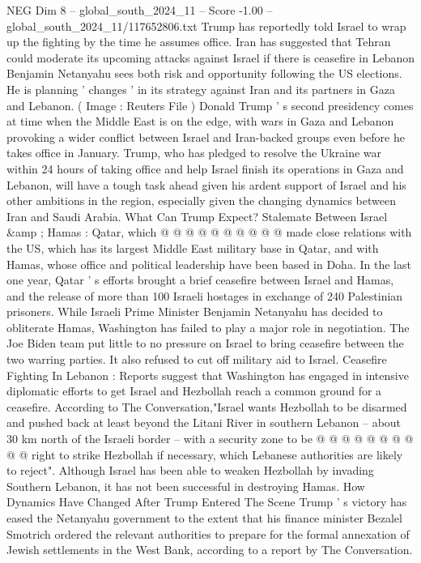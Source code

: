 \begin{textsample}{NEG Dim 8 – global\_south\_2024\_11 – Score -1.00 – global\_south\_2024\_11/117652806.txt}  \label{ex:f8_neg_288}
Trump has reportedly told Israel to wrap up the fighting by the time he assumes office.
Iran has suggested that Tehran could moderate its upcoming attacks against Israel if there is ceasefire in Lebanon Benjamin Netanyahu sees both risk and opportunity following the US elections.
He is planning ' changes ' in its strategy against Iran and its partners in Gaza and Lebanon. ( Image : Reuters File ) Donald Trump ' s second presidency comes at time when the Middle East is on the edge, with wars in Gaza and Lebanon provoking a wider conflict between Israel and Iran-backed groups even before he takes office in January.
Trump, who has pledged to resolve the Ukraine war within 24 hours of taking office and help Israel finish its operations in Gaza and Lebanon, will have a tough task ahead given his ardent support of Israel and his other ambitions in the region, especially given the changing dynamics between Iran and Saudi Arabia.
What Can Trump Expect?
Stalemate Between Israel \&amp ; Hamas : Qatar, which @ @ @ @ @ @ @ @ @ @ made close relations with the US, which has its largest Middle East military base in Qatar, and with Hamas, whose office and political leadership have been based in Doha.
In the last one year, Qatar ' s efforts brought a brief ceasefire between Israel and Hamas, and the release of more than 100 Israeli hostages in exchange of 240 Palestinian prisoners.
While Israeli Prime Minister Benjamin Netanyahu has decided to obliterate Hamas, Washington has failed to play a major role in negotiation.
The Joe Biden team put little to no pressure on Israel to bring ceasefire between the two warring parties.
It also refused to cut off military aid to Israel.
Ceasefire Fighting In Lebanon : Reports suggest that Washington has engaged in intensive diplomatic efforts to get Israel and Hezbollah reach a common ground for a ceasefire.
According to The Conversation,"Israel wants Hezbollah to be disarmed and pushed back at least beyond the Litani River in southern Lebanon -- about 30 km north of the Israeli border -- with a security zone to be @ @ @ @ @ @ @ @ @ @ right to strike Hezbollah if necessary, which Lebanese authorities are likely to reject".
Although Israel has been able to weaken Hezbollah by invading Southern Lebanon, it has not been successful in destroying Hamas.
How Dynamics Have Changed After Trump Entered The Scene Trump ' s victory has eased the Netanyahu government to the extent that his finance minister Bezalel Smotrich ordered the relevant authorities to prepare for the formal annexation of Jewish settlements in the West Bank, according to a report by The Conversation.

\end{textsample}
